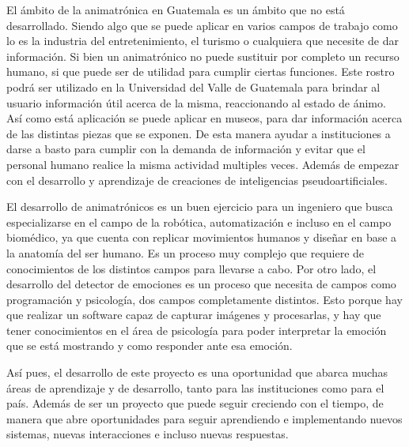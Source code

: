 El ámbito de la animatrónica en Guatemala es un ámbito que no está desarrollado. Siendo algo que se puede aplicar en varios campos de trabajo como lo es la industria del entretenimiento, el turismo o cualquiera que necesite de dar información. Si bien un animatrónico no puede sustituir por completo un recurso humano, si que puede ser de utilidad para cumplir ciertas funciones. Este rostro podrá ser utilizado en la Universidad del Valle de Guatemala para brindar al usuario información útil acerca de la misma, reaccionando al estado de ánimo. Así como está aplicación se puede aplicar en museos, para dar información acerca de las distintas piezas que se exponen. De esta manera ayudar a instituciones a darse a basto para cumplir con la demanda de información y evitar que el personal humano realice la misma actividad multiples veces. Además de empezar con el desarrollo y aprendizaje de creaciones de inteligencias pseudoartificiales.

El desarrollo de animatrónicos es un buen ejercicio para un ingeniero que busca especializarse en el campo de la robótica, automatización e incluso en el campo biomédico, ya que cuenta con replicar movimientos humanos y diseñar en base a la anatomía del ser humano. Es un proceso muy complejo que requiere de conocimientos de los distintos campos para llevarse a cabo. Por otro lado, el desarrollo del detector de emociones es un proceso que necesita de campos como programación y psicología, dos campos completamente distintos. Esto porque hay que realizar un software capaz de capturar imágenes y procesarlas, y hay que tener conocimientos en el área de psicología para poder interpretar la emoción que se está mostrando y como responder ante esa emoción. 

Así pues, el desarrollo de este proyecto es una oportunidad que abarca muchas áreas de aprendizaje y de desarrollo, tanto para las instituciones como para el país. Además de ser un proyecto que puede seguir creciendo con el tiempo, de manera que abre oportunidades para seguir aprendiendo e implementando nuevos sistemas, nuevas interacciones e incluso nuevas respuestas.